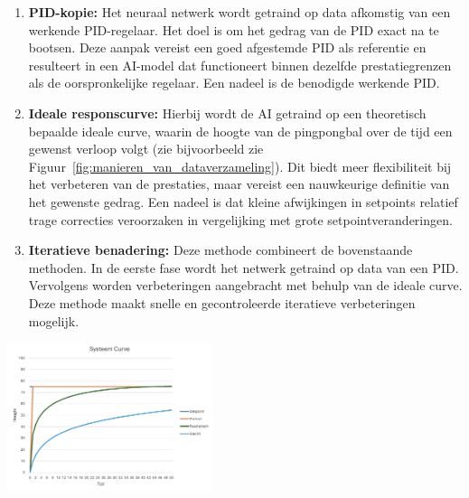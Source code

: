 \begin{enumerate}
    \item \textbf{PID-kopie:} Het neuraal netwerk wordt getraind op data afkomstig van een werkende PID-regelaar. Het doel is om het gedrag van de PID exact na te bootsen. Deze aanpak vereist een goed afgestemde PID als referentie en resulteert in een AI-model dat functioneert binnen dezelfde prestatiegrenzen als de oorspronkelijke regelaar. Een nadeel is de benodigde werkende PID.
    \item \textbf{Ideale responscurve:} Hierbij wordt de AI getraind op een theoretisch bepaalde ideale curve, waarin de hoogte van de pingpongbal over de tijd een gewenst verloop volgt (zie bijvoorbeeld zie Figuur~\ref{fig:manieren_van_dataverzameling}). Dit biedt meer flexibiliteit bij het verbeteren van de prestaties, maar vereist een nauwkeurige definitie van het gewenste gedrag. Een nadeel is dat kleine afwijkingen in setpoints relatief trage correcties veroorzaken in vergelijking met grote setpointveranderingen.
    \item \textbf{Iteratieve benadering:} Deze methode combineert de bovenstaande methoden. In de eerste fase wordt het netwerk getraind op data van een PID. Vervolgens worden verbeteringen aangebracht met behulp van de ideale curve. Deze methode maakt snelle en gecontroleerde iteratieve verbeteringen mogelijk.
\end{enumerate}

\begin{center}
\centering
\includegraphics[width=0.45\textwidth]{./afbeeldingen/dataverzameling.png}
\label{fig:manieren_van_dataverzameling}

\end{center}

